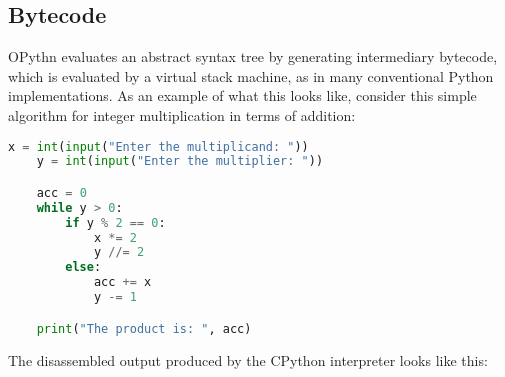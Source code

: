 \documentclass[11pt, twoside]{article}
\begin{document}
    \subsection{Bytecode}
    OPythn evaluates an abstract syntax tree by generating intermediary bytecode, which is evaluated by a virtual stack machine, as in many conventional Python implementations. As an example of what this looks like, consider this simple algorithm for integer multiplication in terms of addition:
    \begin{lstlisting}[language=python]
    x = int(input("Enter the multiplicand: "))
    y = int(input("Enter the multiplier: "))

    acc = 0
    while y > 0:
        if y % 2 == 0:
            x *= 2
            y //= 2
        else:
            acc += x
            y -= 1

    print("The product is: ", acc)
    \end{lstlisting}
    The disassembled output produced by the CPython interpreter looks like this:
\end{document}
